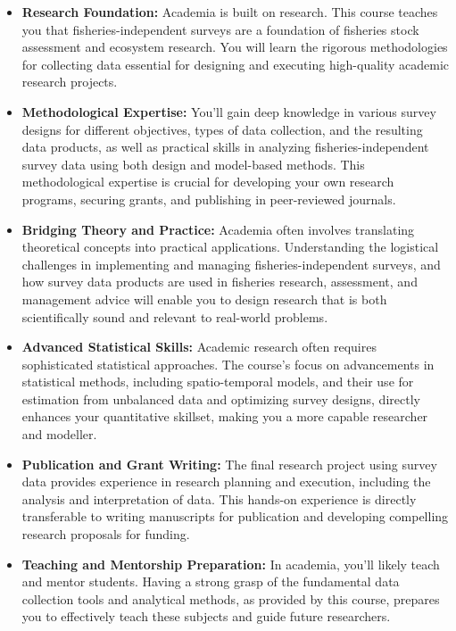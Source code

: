 \documentclass[
  letterpaper,
  oneside,
  open=any]{scrbook}
\providecommand{\tightlist}{%
  \setlength{\itemsep}{0pt}\setlength{\parskip}{0pt}}\usepackage{longtable,booktabs,array}
\begin{document}
\begin{itemize}
\tightlist
\item
  \textbf{Research Foundation:} Academia is built on research. This
  course teaches you that fisheries-independent surveys are a foundation
  of fisheries stock assessment and ecosystem research. You will learn
  the rigorous methodologies for collecting data essential for designing
  and executing high-quality academic research projects.
\item
  \textbf{Methodological Expertise:} You'll gain deep knowledge in
  various survey designs for different objectives, types of data
  collection, and the resulting data products, as well as practical
  skills in analyzing fisheries-independent survey data using both
  design and model-based methods. This methodological expertise is
  crucial for developing your own research programs, securing grants,
  and publishing in peer-reviewed journals.
\item
  \textbf{Bridging Theory and Practice:} Academia often involves
  translating theoretical concepts into practical applications.
  Understanding the logistical challenges in implementing and managing
  fisheries-independent surveys, and how survey data products are used
  in fisheries research, assessment, and management advice will enable
  you to design research that is both scientifically sound and relevant
  to real-world problems.
\item
  \textbf{Advanced Statistical Skills:} Academic research often requires
  sophisticated statistical approaches. The course's focus on
  advancements in statistical methods, including spatio-temporal models,
  and their use for estimation from unbalanced data and optimizing
  survey designs, directly enhances your quantitative skillset, making
  you a more capable researcher and modeller.
\item
  \textbf{Publication and Grant Writing:} The final research project
  using survey data provides experience in research planning and
  execution, including the analysis and interpretation of data. This
  hands-on experience is directly transferable to writing manuscripts
  for publication and developing compelling research proposals for
  funding.
\item
  \textbf{Teaching and Mentorship Preparation:} In academia, you'll
  likely teach and mentor students. Having a strong grasp of the
  fundamental data collection tools and analytical methods, as provided
  by this course, prepares you to effectively teach these subjects and
  guide future researchers.

\end{itemize}
\end{document}
